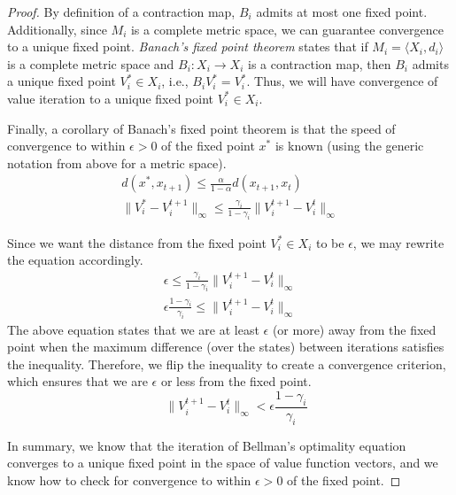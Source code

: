 \begin{proof}
By definition of a contraction map, $B_i$ admits at most one fixed point. Additionally, since $M_i$ is a complete metric space, we can guarantee convergence to a unique fixed point. \emph{Banach's fixed point theorem} states that if $M_i = \langle X_i, d_i \rangle$ is a complete metric space and $B_i: X_i \rightarrow X_i$ is a contraction map, then $B_i$ admits a unique fixed point $V_i^* \in X_i$, i.e., $B_i V_i^* = V_i^*$. Thus, we will have convergence of value iteration to a unique fixed point $V_i^* \in X_i$.

Finally, a corollary of Banach's fixed point theorem is that the speed of convergence to within $\epsilon > 0$ of the fixed point $x^*$ is known (using the generic notation from above for a metric space).
\begin{multline*}
    d(x^*, x_{t+1}) \leq \frac{\alpha}{1 - \alpha} d(x_{t+1}, x_t) \\
    \| V_i^* - V_i^{t+1}\|_\infty \leq \frac{\gamma_i}{1 - \gamma_i} \| V_i^{t+1} - V_i^t \|_\infty
\end{multline*}

Since we want the distance from the fixed point $V_i^* \in X_i$ to be $\epsilon$, we may rewrite the equation accordingly.
\begin{multline*}
    \epsilon \leq \frac{\gamma_i}{1 - \gamma_i} \| V_i^{t+1} - V_i^t \|_\infty \\
    \epsilon \frac{1 - \gamma_i}{\gamma_i} \leq \| V_i^{t+1} - V_i^t \|_\infty
\end{multline*}
The above equation states that we are at least $\epsilon$ (or more) away from the fixed point when the maximum difference (over the states) between iterations satisfies the inequality. Therefore, we flip the inequality to create a convergence criterion, which ensures that we are $\epsilon$ or less from the fixed point.
\begin{equation*}
    \quad \| V_i^{t+1} - V_i^t \|_\infty < \epsilon \frac{1 - \gamma_i}{\gamma_i}
\end{equation*}

In summary, we know that the iteration of Bellman's optimality equation converges to a unique fixed point in the space of value function vectors, and we know how to check for convergence to within $\epsilon > 0$ of the fixed point.
\end{proof}

